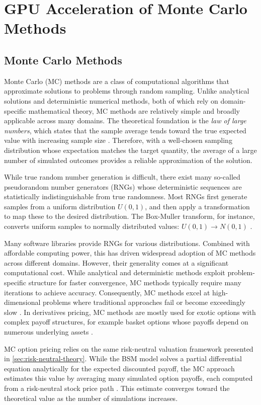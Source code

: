 \documentclass[english,12pt,a4paper,pdftex,sci,utf8]{aaltothesis}
\begin{document}
\section{GPU Acceleration of Monte Carlo Methods} \label{sec:gpu-mc}
\subsection{Monte Carlo Methods}
Monte Carlo (MC) methods are a class of computational algorithms that approximate solutions to problems through random sampling. Unlike analytical solutions and deterministic numerical methods, both of which rely on domain-specific mathematical theory, MC methods are relatively simple and broadly applicable across many domains. The theoretical foundation is the \emph{law of large numbers}, which states that the sample average tends toward the true expected value with increasing sample size \cite{Ross2020prob}. Therefore, with a well-chosen sampling distribution whose expectation matches the target quantity, the average of a large number of simulated outcomes provides a reliable approximation of the solution.

While true random number generation is difficult, there exist many so-called pseudorandom number generators (RNGs) whose deterministic sequences are statistically indistinguishable from true randomness. Most RNGs first generate samples from a uniform distribution $U(0,1)$, and then apply a transformation to map these to the desired distribution. The Box-Muller transform, for instance, converts uniform samples to normally distributed values: $U(0,1) \rightarrow N(0,1)$ \cite{gentle2003random}.

Many software libraries provide RNGs for various distributions. Combined with affordable computing power, this has driven widespread adoption of MC methods across different domains. However, their generality comes at a significant computational cost. While analytical and deterministic methods exploit problem-specific structure for faster convergence, MC methods typically require many iterations to achieve accuracy. Consequently, MC methods excel at high-dimensional problems where traditional approaches fail or become exceedingly slow \cite{gentle2003random}. In derivatives pricing, MC methods are mostly used for exotic options with complex payoff structures, for example basket options whose payoffs depend on numerous underlying assets \cite{hull2016options,wilmott2013paul}.

MC option pricing relies on the same risk-neutral valuation framework presented in \cref{sec:risk-neutral-theory}. While the BSM model solves a partial differential equation analytically for the expected discounted payoff, the MC approach estimates this value by averaging many simulated option payoffs, each computed from a risk-neutral stock price path \cite{boyle1977options}. This estimate converges toward the theoretical value as the number of simulations increases.
\end{document}
